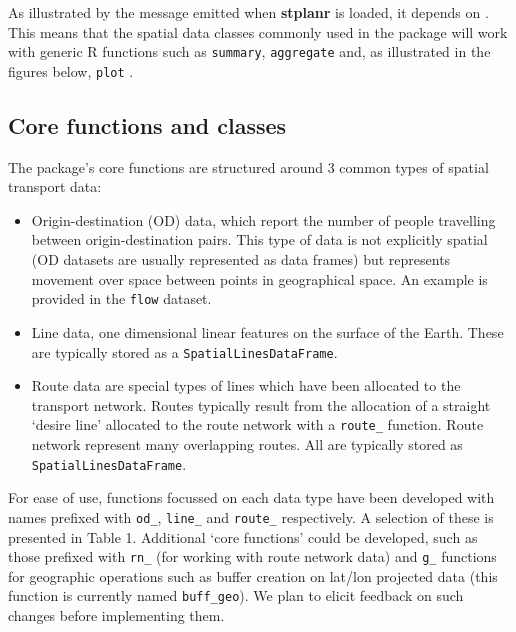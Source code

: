 As illustrated by the message emitted when \textbf{stplanr} is loaded,
it depends on . This means that the spatial data classes
commonly used in the package will work with generic R functions such as
\texttt{summary}, \texttt{aggregate} and, as illustrated in the figures
below, \texttt{plot} \citep{bivand_applied_2013}.

\subsection{Core functions and
classes}\label{core-functions-and-classes}

The package's core functions are structured around 3 common types of
spatial transport data:

\begin{itemize}
\tightlist
\item
  Origin-destination (OD) data, which report the number of people
  travelling between origin-destination pairs. This type of data is not
  explicitly spatial (OD datasets are usually represented as data
  frames) but represents movement over space between points in
  geographical space. An example is provided in the \texttt{flow}
  dataset.
\item
  Line data, one dimensional linear features on the surface of the
  Earth. These are typically stored as a \texttt{SpatialLinesDataFrame}.
\item
  Route data are special types of lines which have been allocated to the
  transport network. Routes typically result from the allocation of a
  straight `desire line' allocated to the route network with a
  \texttt{route\_} function. Route network represent many overlapping
  routes. All are typically stored as \texttt{SpatialLinesDataFrame}.
\end{itemize}

For ease of use, functions focussed on each data type have been
developed with names prefixed with \texttt{od\_}, \texttt{line\_} and
\texttt{route\_} respectively. A selection of these is presented in
Table 1. Additional `core functions' could be developed, such as those
prefixed with \texttt{rn\_} (for working with route network data) and
\texttt{g\_} functions for geographic operations such as buffer creation
on lat/lon projected data (this function is currently named
\texttt{buff\_geo}). We plan to elicit feedback on such changes before
implementing them.

